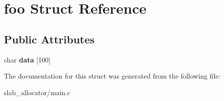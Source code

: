\hypertarget{structfoo}{}\section{foo Struct Reference}
\label{structfoo}
\subsection*{Public Attributes}
\begin{DoxyCompactItemize}
\item 
\mbox{\label{structfoo_a4f0cb361d81b7343369aacb13d4b1a6b}} 
char {\bfseries data} \mbox{[}100\mbox{]}
\end{DoxyCompactItemize}


The documentation for this struct was generated from the following file\+:\begin{DoxyCompactItemize}
\item 
slab\+\_\+allocator/main.\+c\end{DoxyCompactItemize}
